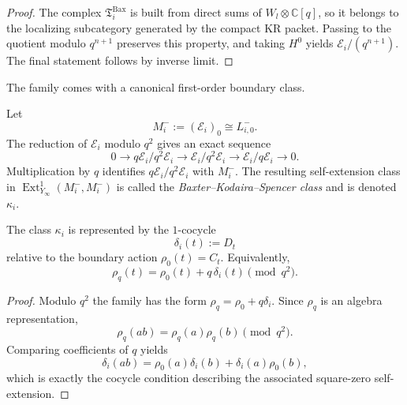 \begin{proof}
The complex $\mathfrak T_i^{\mathrm{Bax}}$ is built from direct sums of
$W_l\otimes\mathbb C[q]$, so it belongs to the localizing subcategory
generated by the compact KR packet. Passing to the quotient modulo
$q^{n+1}$ preserves this property, and taking $H^0$ yields
$\mathcal E_i/(q^{n+1})$. The final statement follows by inverse limit.
\end{proof}

The family comes with a canonical first-order boundary class.

\begin{definition}
\label{def:baxter-kodaira-spencer-class}
Let
\begin{equation}
M_i^-:=(\mathcal E_i)_0\cong L^-_{i,0}.
\end{equation}
The reduction of $\mathcal E_i$ modulo $q^2$ gives an exact sequence
\begin{equation}
0\longrightarrow q\mathcal E_i/q^2\mathcal E_i
\longrightarrow \mathcal E_i/q^2\mathcal E_i
\longrightarrow \mathcal E_i/q\mathcal E_i
\longrightarrow 0.
\end{equation}
Multiplication by $q$ identifies $q\mathcal E_i/q^2\mathcal E_i$ with
$M_i^-$. The resulting self-extension class in
$\operatorname{Ext}^1_{Y_\infty}(M_i^-,M_i^-)$ is called the
\emph{Baxter--Kodaira--Spencer class} and is denoted $\kappa_i$.
\end{definition}

\begin{theorem}
\ClaimStatusProvedHere
\label{thm:concrete-cocycle-representative}
The class $\kappa_i$ is represented by the $1$-cocycle
\begin{equation}
\delta_i(t):=D_t
\end{equation}
relative to the boundary action $\rho_0(t)=C_t$. Equivalently,
\begin{equation}
\rho_q(t)=\rho_0(t)+q\,\delta_i(t)\pmod{q^2}.
\end{equation}
\end{theorem}

\begin{proof}
Modulo $q^2$ the family has the form
$\rho_q=\rho_0+q\delta_i$. Since $\rho_q$ is an algebra representation,
\begin{equation}
\rho_q(ab)=\rho_q(a)\rho_q(b)\pmod{q^2}.
\end{equation}
Comparing coefficients of $q$ yields
\begin{equation}
\delta_i(ab)=\rho_0(a)\delta_i(b)+\delta_i(a)\rho_0(b),
\end{equation}
which is exactly the cocycle condition describing the associated
square-zero self-extension.
\end{proof}


